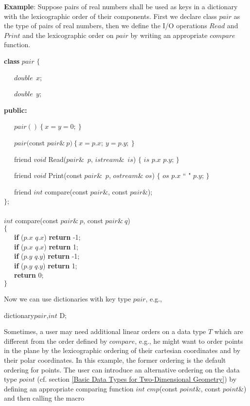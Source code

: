 {\bf Example}: Suppose pairs of real numbers shall be used as keys 
in a dictionary with the lexicographic order of their components.
First we declare class $pair$ as the type of pairs of real numbers, 
then we define the I/O operations $Read$ and $Print$ and the 
lexicographic order on $pair$ by writing an appropriate $compare$ function.


\bigskip
{\bf class} $pair$ $\{$

\ \ \ $double\ \ x$;

\ \ \ $double\ \ y$;

{\bf public:}

\ \ \ $pair()\ \{\ x = y = 0;\ \}$

\ \ \ $pair($const $pair\&\ p)\ \{\ x = p.x;\ y = p.y;\ \}$

\smallskip
\ \ \ friend $void$ Read($pair$\&\ $p$, $istream$\&\ $is$)
      $\{$ $is$ \>\> $p.x$ \>\> $p.y$; $\}$

\ \ \ friend $void$ Print(const $pair$\&\ $p$, $ostream$\& $os$) 
      $\{$ $os$ \<\< $p.x$ \<\< `` " \<\< $p.y$; $\}$

\ \ \ friend $int$ compare(const $pair$\&, const $pair$\&);\\
$\}$;\\
\\
$int$ compare(const $pair\&\ p$, const $pair\&\ q$)\\
$\{$\\
\smallskip
\ \ \ {\bf if} ($p.x$ \< $q.x$) {\bf return } -1;\\
\smallskip
\ \ \ {\bf if} ($p.x$ \> $q.x$) {\bf return }  1;\\ 
\smallskip
\ \ \ {\bf if} ($p.y$ \< $q.y$) {\bf return } -1;\\
\smallskip
\ \ \ {\bf if} ($p.y$ \> $q.y$) {\bf return }  1;\\
\smallskip
\ \ \ {\bf return} 0; \\
$\}$

\smallskip
Now we can use dictionaries with key type $pair$, e.g.,

dictionary\<$pair$,$int$\> D;

\bigskip
Sometimes, a user may need additional linear orders on a data type $T$ 
which are different from the order defined by $compare$, e.g., he might 
want to order points in the plane by the lexicographic ordering of their 
cartesian coordinates and by their polar coordinates. In this example, the 
former ordering is the default ordering for points. The user can introduce 
an alternative ordering on the data type $point$ (cf. section 
\ref{Basic Data Types for Two-Dimensional Geometry}) by defining
an appropriate comparing function $int$ $cmp$(const $point$\&, const $point$\&)
and then calling the macro 

